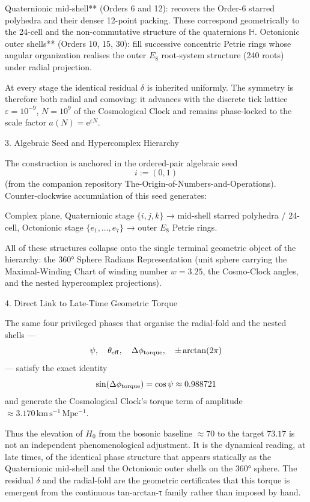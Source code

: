 Quaternionic mid-shell** (Orders 6 and 12): recovers the Order-6 starred polyhedra and their denser 12-point packing. These correspond geometrically to the 24-cell and the non-commutative structure of the quaternions \(\mathbb{H}\).
Octonionic outer shells** (Orders 10, 15, 30): fill successive concentric Petrie rings whose angular organization realises the outer \(E_8\) root-system structure (240 roots) under radial projection.

At every stage the identical residual \(\delta\) is inherited uniformly. The symmetry is therefore both radial and comoving: it advances with the discrete tick lattice \(\varepsilon=10^{-9}\), \(N=10^9\) of the Cosmological Clock and remains phase-locked to the scale factor \(a(N)=\mathrm{e}^{\varepsilon N}\).

3. Algebraic Seed and Hypercomplex Hierarchy

The construction is anchored in the ordered-pair algebraic seed
\[
i:=(0,1)
\]
(from the companion repository The-Origin-of-Numbers-and-Operations). Counter-clockwise accumulation of this seed generates:

Complex plane,
Quaternionic stage \(\{i,j,k\}\) → mid-shell starred polyhedra / 24-cell,
Octonionic stage \(\{e_1,\dots,e_7\}\) → outer \(E_8\) Petrie rings.

All of these structures collapse onto the single terminal geometric object of the hierarchy: the 360° Sphere Radians Representation (unit sphere carrying the Maximal-Winding Chart of winding number \(w=3.25\), the Cosmo-Clock angles, and the nested hypercomplex projections).

4. Direct Link to Late-Time Geometric Torque

The same four privileged phases that organise the radial-fold and the nested shells —
\[
\psi,\quad\theta_{\rm eff},\quad\Delta\phi_{\rm torque},\quad\pm\arctan(2\pi)
\]
— satisfy the exact identity
\[
\sin(\Delta\phi_{\rm torque})=\cos\psi\approx 0.988721
\]
and generate the Cosmological Clock’s torque term of amplitude \(\approx 3.170\,\mathrm{km\,s^{-1}\,Mpc^{-1}}\).  

Thus the elevation of \(H_0\) from the bosonic baseline \(\approx 70\) to the target \(73.17\) is not an independent phenomenological adjustment. It is the dynamical reading, at late times, of the identical phase structure that appears statically as the Quaternionic mid-shell and the Octonionic outer shells on the 360° sphere. The residual \(\delta\) and the radial-fold are the geometric certificates that this torque is emergent from the continuous tan-arctan-τ family rather than imposed by hand.

